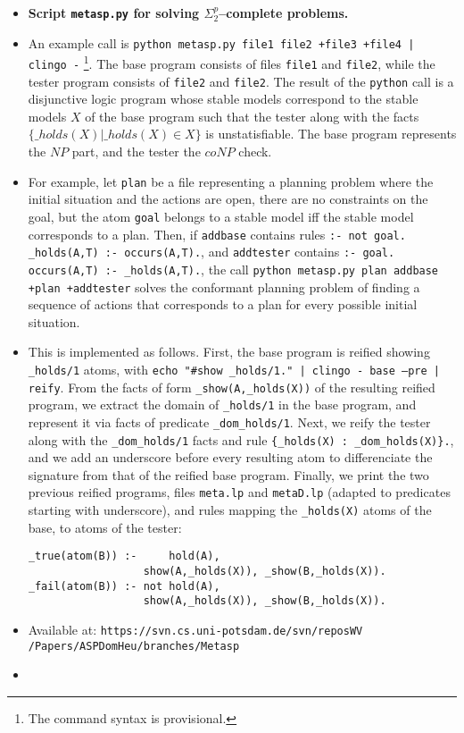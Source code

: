 \documentclass[a4paper,10pt]{article}
\begin{document}
\begin{itemize}
\item
\textbf{Script \texttt{metasp.py} for solving $\Sigma^p_2$--complete problems.}
\item
An example call is 
\texttt{python metasp.py file1 file2 +file3 +file4 | clingo -}
\footnote{The command syntax is provisional.}.
The base program consists of files \texttt{file1} and \texttt{file2}, 
while the tester program consists of \texttt{file2} and \texttt{file2}.
The result of the \texttt{python} call is a disjunctive logic program whose stable models
correspond to the stable models $X$ of the base program such that 
the tester along with the facts $\{\_holds(X) | \_holds(X) \in X \}$ is unstatisfiable.
The base program represents the $NP$ part, and the tester the $coNP$ check.
\item
For example, let \texttt{plan} be a file representing a planning problem where 
the initial situation and the actions are open, there are no constraints on the goal,  
but the atom \texttt{goal} belongs to a stable model iff the stable model corresponds to a plan.
Then, if \texttt{addbase} contains rules \texttt{:- not goal. \_holds(A,T) :- occurs(A,T).}, 
and \texttt{addtester} contains \texttt{:- goal. occurs(A,T) :- \_holds(A,T).}, 
the call \texttt{python metasp.py plan addbase +plan +addtester} 
solves the conformant planning problem of finding a sequence of actions that 
corresponds to a plan for every possible initial situation.
\item
This is implemented as follows. 
First, the base program is reified showing \texttt{\_holds/1} atoms, with \texttt{echo "\#show \_holds/1." | clingo - base --pre | reify}.
From the facts of form \texttt{\_show(A,\_holds(X))} of the resulting reified program, 
we extract the domain of \texttt{\_holds/1} in the base program,
and represent it via facts of predicate \texttt{\_dom\_holds/1}.
Next, we reify the tester along with the \texttt{\_dom\_holds/1} facts and rule \texttt{\{\_holds(X) : \_dom\_holds(X)\}.}, 
and we add an underscore before every resulting atom to differenciate the signature from that of the reified base program.
Finally, we print the two previous reified programs,  
files \texttt{meta.lp} and \texttt{metaD.lp} (adapted to predicates starting with underscore), 
and rules mapping the \texttt{\_holds(X)} atoms of the base, to atoms of the tester:
\begin{verbatim}
_true(atom(B)) :-     hold(A), 
                  show(A,_holds(X)), _show(B,_holds(X)).
_fail(atom(B)) :- not hold(A), 
                  show(A,_holds(X)), _show(B,_holds(X)).
\end{verbatim}
\item
Available at: \texttt{https://svn.cs.uni-potsdam.de/svn/reposWV
/Papers/ASPDomHeu/branches/Metasp}
\item


\end{itemize}
\end{document}
